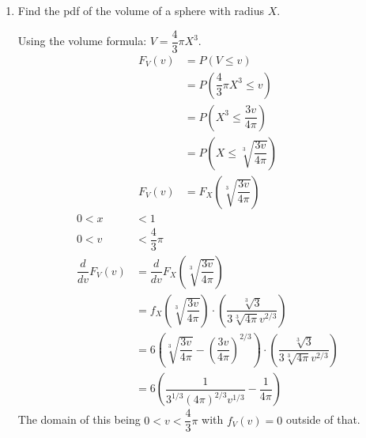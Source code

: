 \documentclass[11pt]{article}
\begin{document}
\begin{enumerate}[label=(\alph*)]
\begin{solution}
        Given that $0 < x < 1$, $0 < a < \pi$.
        We also know $f_X$, so plugging it in we get
        \begin{align*}
            f_A(a) &= f_X\left(\sqrt{\dfrac{a}{\pi}}\right)\cdot\left(\dfrac{1}{2\sqrt{a\pi}}\right) \\
            &= 6\sqrt{\dfrac{a}{\pi}}\left( 1 - \sqrt{\dfrac{a}{\pi}} \right) \cdot \left(\dfrac{1}{2\sqrt{a\pi}}\right) \\
            &= \left(6\sqrt{\dfrac{a}{\pi}} - 6\dfrac{a}{\pi}\right) \cdot \left(\dfrac{1}{2\sqrt{a\pi}}\right) \\
            &= \dfrac{3}{\pi} - \dfrac{3\sqrt{a}}{\pi^{3/2}}
        \end{align*}
    \end{solution}

    \vspace{4em}

    \item Find the pdf of the volume of a sphere with radius $X$.
    \begin{solution}

        Using the volume formula: $V = \dfrac{4}{3}\pi X^3$.
        \begin{align*}
            F_V(v) &= P(V \leq v) \\
            &= P(\dfrac{4}{3} \pi X^3 \leq v) \\
            &= P(X^3 \leq \dfrac{3v}{4\pi}) \\
            &= P(X \leq \sqrt[3]{\dfrac{3v}{4\pi}}) \\
            F_V(v) &= F_X\left(\sqrt[3]{\dfrac{3v}{4\pi}}\right)
        \end{align*}
        \begin{align*}
            0 < x &< 1 \\
            0 < v &< \dfrac{4}{3}\pi \\
            \dfrac{d}{dv} F_V(v) &= \dfrac{d}{dv} F_X\left(\sqrt[3]{\dfrac{3v}{4\pi}}\right) \\
            &= f_X\left(\sqrt[3]{\dfrac{3v}{4\pi}}\right) \cdot \left(\dfrac{\sqrt[3]{3}}{3\sqrt[3]{4\pi}v^{2/3}}\right) \\
            &= 6\left(\sqrt[3]{\dfrac{3v}{4\pi}} - \left(\dfrac{3v}{4\pi}\right)^{2/3}\right) \cdot \left(\dfrac{\sqrt[3]{3}}{3\sqrt[3]{4\pi}v^{2/3}}\right) \\
            &= 6\left( \dfrac{1}{3^{1/3} (4\pi)^{2/3} v^{1/3} } - \dfrac{1}{4\pi} \right)
        \end{align*}
        The domain of this being $0 < v < \dfrac{4}{3}\pi$ with $f_V(v) = 0$ outside of that.
    \end{solution}


\end{enumerate}
\end{document}
